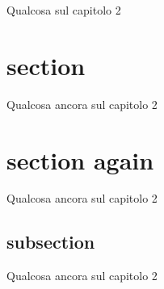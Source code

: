 %
%
Qualcosa sul capitolo 2
\section{section}
Qualcosa ancora sul capitolo 2
\section{section again}
Qualcosa ancora sul capitolo 2
\subsection{subsection}
Qualcosa ancora sul capitolo 2